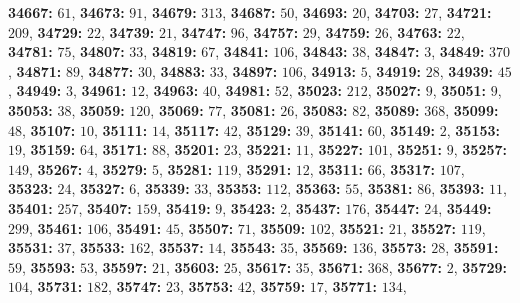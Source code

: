 \textsf{\bfseries 34667:} $61$, \textsf{\bfseries 34673:} $91$, \textsf{\bfseries 34679:} $313$, \textsf{\bfseries 34687:} $50$, \textsf{\bfseries 34693:} $20$, \textsf{\bfseries 34703:} $27$, \textsf{\bfseries 34721:} $209$, \textsf{\bfseries 34729:} $22$, \textsf{\bfseries 34739:} $21$, \textsf{\bfseries 34747:} $96$, \textsf{\bfseries 34757:} $29$, \textsf{\bfseries 34759:} $26$, \textsf{\bfseries 34763:} $22$, \textsf{\bfseries 34781:} $75$, \textsf{\bfseries 34807:} $33$, \textsf{\bfseries 34819:} $67$, \textsf{\bfseries 34841:} $106$, \textsf{\bfseries 34843:} $38$, \textsf{\bfseries 34847:} $3$, \textsf{\bfseries 34849:} $370$, \textsf{\bfseries 34871:} $89$, \textsf{\bfseries 34877:} $30$, \textsf{\bfseries 34883:} $33$, \textsf{\bfseries 34897:} $106$, \textsf{\bfseries 34913:} $5$, \textsf{\bfseries 34919:} $28$, \textsf{\bfseries 34939:} $45$, \textsf{\bfseries 34949:} $3$, \textsf{\bfseries 34961:} $12$, \textsf{\bfseries 34963:} $40$, \textsf{\bfseries 34981:} $52$, \textsf{\bfseries 35023:} $212$, \textsf{\bfseries 35027:} $9$, \textsf{\bfseries 35051:} $9$, \textsf{\bfseries 35053:} $38$, \textsf{\bfseries 35059:} $120$, \textsf{\bfseries 35069:} $77$, \textsf{\bfseries 35081:} $26$, \textsf{\bfseries 35083:} $82$, \textsf{\bfseries 35089:} $368$, \textsf{\bfseries 35099:} $48$, \textsf{\bfseries 35107:} $10$, \textsf{\bfseries 35111:} $14$, \textsf{\bfseries 35117:} $42$, \textsf{\bfseries 35129:} $39$, \textsf{\bfseries 35141:} $60$, \textsf{\bfseries 35149:} $2$, \textsf{\bfseries 35153:} $19$, \textsf{\bfseries 35159:} $64$, \textsf{\bfseries 35171:} $88$, \textsf{\bfseries 35201:} $23$, \textsf{\bfseries 35221:} $11$, \textsf{\bfseries 35227:} $101$, \textsf{\bfseries 35251:} $9$, \textsf{\bfseries 35257:} $149$, \textsf{\bfseries 35267:} $4$, \textsf{\bfseries 35279:} $5$, \textsf{\bfseries 35281:} $119$, \textsf{\bfseries 35291:} $12$, \textsf{\bfseries 35311:} $66$, \textsf{\bfseries 35317:} $107$, \textsf{\bfseries 35323:} $24$, \textsf{\bfseries 35327:} $6$, \textsf{\bfseries 35339:} $33$, \textsf{\bfseries 35353:} $112$, \textsf{\bfseries 35363:} $55$, \textsf{\bfseries 35381:} $86$, \textsf{\bfseries 35393:} $11$, \textsf{\bfseries 35401:} $257$, \textsf{\bfseries 35407:} $159$, \textsf{\bfseries 35419:} $9$, \textsf{\bfseries 35423:} $2$, \textsf{\bfseries 35437:} $176$, \textsf{\bfseries 35447:} $24$, \textsf{\bfseries 35449:} $299$, \textsf{\bfseries 35461:} $106$, \textsf{\bfseries 35491:} $45$, \textsf{\bfseries 35507:} $71$, \textsf{\bfseries 35509:} $102$, \textsf{\bfseries 35521:} $21$, \textsf{\bfseries 35527:} $119$, \textsf{\bfseries 35531:} $37$, \textsf{\bfseries 35533:} $162$, \textsf{\bfseries 35537:} $14$, \textsf{\bfseries 35543:} $35$, \textsf{\bfseries 35569:} $136$, \textsf{\bfseries 35573:} $28$, \textsf{\bfseries 35591:} $59$, \textsf{\bfseries 35593:} $53$, \textsf{\bfseries 35597:} $21$, \textsf{\bfseries 35603:} $25$, \textsf{\bfseries 35617:} $35$, \textsf{\bfseries 35671:} $368$, \textsf{\bfseries 35677:} $2$, \textsf{\bfseries 35729:} $104$, \textsf{\bfseries 35731:} $182$, \textsf{\bfseries 35747:} $23$, \textsf{\bfseries 35753:} $42$, \textsf{\bfseries 35759:} $17$, \textsf{\bfseries 35771:} $134$, 
